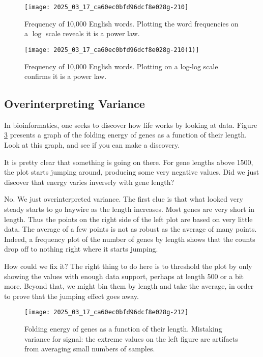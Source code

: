 \documentclass[10pt]{article}
\begin{document}
\begin{figure}[htbp]
    \centering
    \texttt{[image: 2025\_03\_17\_ca60ec0bfd96dcf8e028g-210]}
    \caption{Frequency of 10,000 English words. Plotting the word frequencies on a $\log$ scale reveals it is a power law.}
    \label{fig:frequency_log}
\end{figure}

\begin{figure}[htbp]
    \centering
    \texttt{[image: 2025\_03\_17\_ca60ec0bfd96dcf8e028g-210(1)]}
    \caption{Frequency of 10,000 English words. Plotting on a log-log scale confirms it is a power law.}
    \label{fig:frequency_loglog}
\end{figure}

\subsection{Overinterpreting Variance}
In bioinformatics, one seeks to discover how life works by looking at data. Figure \ref{fig:gene_folding} presents a graph of the folding energy of genes as a function of their length. Look at this graph, and see if you can make a discovery.

It is pretty clear that something is going on there. For gene lengths above 1500, the plot starts jumping around, producing some very negative values. Did we just discover that energy varies inversely with gene length?

No. We just overinterpreted variance. The first clue is that what looked very steady starts to go haywire as the length increases. Most genes are very short in length. Thus the points on the right side of the left plot are based on very little data. The average of a few points is not as robust as the average of many points. Indeed, a frequency plot of the number of genes by length shows that the counts drop off to nothing right where it starts jumping.

How could we fix it? The right thing to do here is to threshold the plot by only showing the values with enough data support, perhaps at length 500 or a bit more. Beyond that, we might bin them by length and take the average, in order to prove that the jumping effect goes away.

\begin{figure}[htbp]
    \centering
    \texttt{[image: 2025\_03\_17\_ca60ec0bfd96dcf8e028g-212]}
    \caption{Folding energy of genes as a function of their length. Mistaking variance for signal: the extreme values on the left figure are artifacts from averaging small numbers of samples.}
    \label{fig:gene_folding}
\end{figure}
\end{document}

